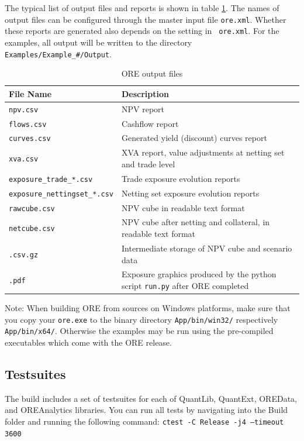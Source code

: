 The typical list of output files and reports is shown in table \ref{tab_2}. The names of output files can be configured
through the master input file {\tt ore.xml}. Whether these reports are generated also depends on the setting in {\tt
  ore.xml}. For the examples, all output will be written to the directory {\tt Examples/Example\_\#/Output}.

\begin{table}[h]
\scriptsize
\begin{center}
\begin{tabular}{|l|p{11cm}|}
\hline
File Name & Description \\
\hline
{\tt npv.csv}&   NPV report \\
{\tt flows.csv} & Cashflow report \\
{\tt curves.csv} & Generated yield (discount) curves report \\
{\tt xva.csv} & XVA report, value adjustments at netting set and trade level \\
{\tt exposure\_trade\_*.csv} & Trade exposure evolution reports\\
{\tt exposure\_nettingset\_*.csv} &  Netting set exposure evolution reports\\
{\tt rawcube.csv} & NPV cube in readable text format \\
{\tt netcube.csv} & NPV cube after netting and collateral, in readable text format \\
{\tt *.csv.gz} & Intermediate storage of NPV cube and scenario data \\
{\tt *.pdf} &  Exposure graphics produced by the python script {\tt run.py} after ORE completed\\
\hline
\end{tabular}
\end{center}
\caption{ORE output files}
\label{tab_2}
\end{table}

Note: When building ORE from sources on Windows platforms, make sure that you copy your {\tt ore.exe} to the binary
directory {\tt App/bin/win32/} respectively {\tt App/bin/x64/}. Otherwise the examples may be run using the pre-compiled
executables which come with the ORE release.

\subsection{Testsuites}\label{example:testsuites}

The build includes a set of testsuites for each of QuantLib, QuantExt, OREData, and OREAnalytics libraries. You can run
all tests by navigating into the Build folder and running the following command:
{\tt ctest -C Release -j4 --timeout 3600}


